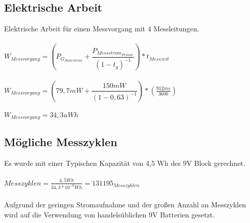 \subsection{Elektrische Arbeit}

Elektrische Arbeit für einen Messvorgang mit 4 Messleitungen.
\\
\\
$W_{Messvorgang} = (P_{G_{Ruhestrom}} + \dfrac{P_{Messstrom_{Primär}}}{(1 - t_{g})^{-1}}) * t_{Messzeit}$
\\
\\
$W_{Messvorgang} = (79,7mW + \dfrac{150mW}{(1-0,63)^{-1}}) * (\frac{912ms}{3600})$
\\
\\
$W_{Messvorgang} = 34,3uWh$

\subsection{Mögliche Messzyklen}
Es wurde mit einer Typischen Kapazität von 4,5 Wh des 9V Block gerechnet.
\\
\\
$Messzyklen = \frac{4,5Wh}{34,3 * 10^{-6}Wh} = 131195_{Messzyklen}$
\\
\\
Aufgrund der geringen Stromaufnahme und der großen Anzahl an Messzyklen wird auf die Verwendung von handelsüblichen 9V Batterien gesetzt. 
\\

